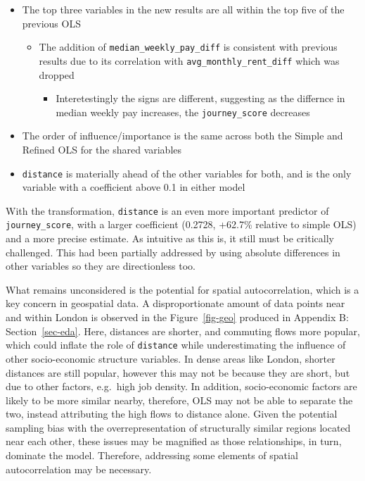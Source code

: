 \documentclass[
  number]{elsarticle}
\providecommand{\tightlist}{%
  \setlength{\itemsep}{0pt}\setlength{\parskip}{0pt}}
\begin{document}
\begin{itemize}
\item
  The top three variables in the new results are all within the top five
  of the previous OLS

  \begin{itemize}
  \item
    The addition of
    \texttt{\textquotesingle{}median\_weekly\_pay\_diff\textquotesingle{}}
    is consistent with previous results due to its correlation with
    \texttt{\textquotesingle{}avg\_monthly\_rent\_diff\textquotesingle{}}
    which was dropped

    \begin{itemize}
    \tightlist
    \item
      Interetestingly the signs are different, suggesting as the
      differnce in median weekly pay increases, the
      \texttt{\textquotesingle{}journey\_score\textquotesingle{}}
      decreases
    \end{itemize}
  \end{itemize}
\item
  The order of influence/importance is the same across both the Simple
  and Refined OLS for the shared variables
\item
  \texttt{\textquotesingle{}distance\textquotesingle{}} is materially
  ahead of the other variables for both, and is the only variable with a
  coefficient above 0.1 in either model
\end{itemize}

With the transformation,
\texttt{\textquotesingle{}distance\textquotesingle{}} is an even more
important predictor of
\texttt{\textquotesingle{}journey\_score\textquotesingle{}}, with a
larger coefficient (0.2728, +62.7\% relative to simple OLS) and a more
precise estimate. As intuitive as this is, it still must be critically
challenged. This had been partially addressed by using absolute
differences in other variables so they are directionless too.

What remains unconsidered is the potential for spatial autocorrelation,
which is a key concern in geospatial data. A disproportionate amount of
data points near and within London is observed in the
Figure~\ref{fig-geo} produced in Appendix B: Section~\ref{sec-eda}.
Here, distances are shorter, and commuting flows more popular, which
could inflate the role of
\texttt{\textquotesingle{}distance\textquotesingle{}} while
underestimating the influence of other socio-economic structure
variables. In dense areas like London, shorter distances are still
popular, however this may not be because they are short, but due to
other factors, e.g.~high job density. In addition, socio-economic
factors are likely to be more similar nearby, therefore, OLS may not be
able to separate the two, instead attributing the high flows to distance
alone. Given the potential sampling bias with the overrepresentation of
structurally similar regions located near each other, these issues may
be magnified as those relationships, in turn, dominate the model.
Therefore, addressing some elements of spatial autocorrelation may be
necessary.
\end{document}
